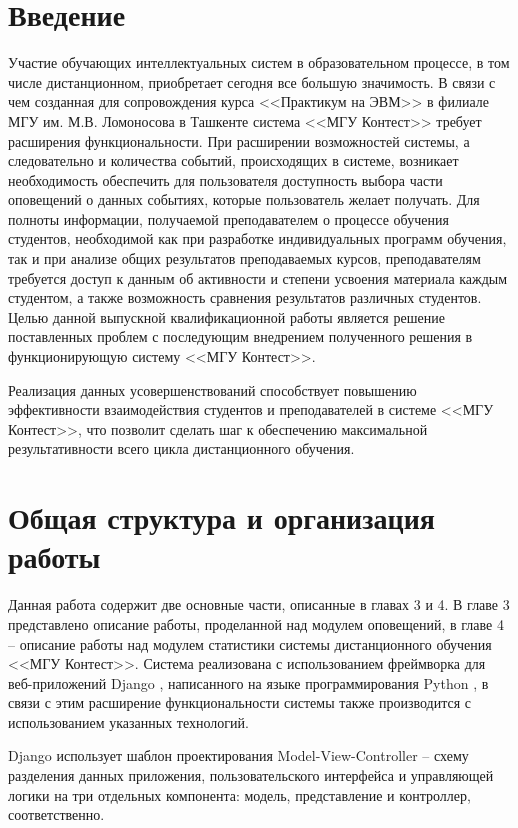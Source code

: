 \documentclass[12pt, a4paper, oneside]{article}
\begin{document}
\section{Введение}
Участие обучающих интеллектуальных систем в образовательном процессе, в том числе дистанционном, приобретает сегодня все большую значимость. В связи с чем созданная для сопровождения курса <<Практикум на ЭВМ>> в филиале МГУ им. М.В. Ломоносова в Ташкенте система <<МГУ Контест>> требует расширения функциональности. При расширении возможностей системы, а следовательно и количества событий, происходящих в системе, возникает необходимость обеспечить для пользователя доступность выбора части оповещений о данных событиях, которые пользователь желает получать. Для полноты информации, получаемой преподавателем о процессе обучения студентов, необходимой как при разработке индивидуальных программ обучения, так и при анализе общих результатов преподаваемых курсов, преподавателям требуется доступ к данным об активности и степени усвоения материала каждым студентом, а также возможность сравнения результатов различных студентов. Целью данной выпускной квалификационной работы является решение поставленных проблем с последующим внедрением полученного решения в функционирующую систему <<МГУ Контест>>.

Реализация данных усовершенствований способствует повышению эффективности взаимодействия студентов и преподавателей в системе <<МГУ Контест>>, что позволит сделать шаг к обеспечению максимальной результативности всего цикла дистанционного обучения.
\newpage

\section{Общая структура и организация работы}
Данная работа содержит две основные части, описанные в главах 3 и 4. В главе 3 представлено описание работы, проделанной над модулем оповещений, в главе 4 – описание работы над модулем статистики системы дистанционного обучения <<МГУ Контест>>. Система реализована с использованием фреймворка для веб-приложений Django \cite{django}, написанного на языке программирования Python \cite{python}, в связи с этим расширение функциональности системы также производится с использованием указанных технологий.

Django использует шаблон проектирования Model-View-Controller – схему разделения данных приложения, пользовательского интерфейса и управляющей логики на три отдельных компонента: модель, представление и контроллер, соответственно.
\end{document}
